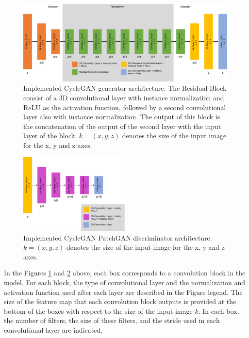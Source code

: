 \begin{figure}[!htb]
  \centering
  \includegraphics[width=0.99\textwidth]{Images/generator_cyclegan.jpg}
  \caption[Implemented CycleGAN generator architecture. The Residual Block consist of a 3D convolutional layer with instance normalization and ReLU as the activation function, followed by a second convolutional layer also with instance normalization. The output of this block is the concatenation of the output of the second layer with the input layer of the block. $k=(x,y,z)$ denotes the size of the input image for the x, y and z axes.]{Implemented CycleGAN generator architecture. The Residual Block consist of a \ac{3D} convolutional layer with instance normalization and \ac{ReLU} as the activation function, followed by a second convolutional layer also with instance normalization. The output of this block is the concatenation of the output of the second layer with the input layer of the block. $k=(x,y,z)$ denotes the size of the input image for the x, y and z axes.}
  \label{fig:gencyc}
\end{figure}

\begin{figure}[!htb]
  \centering
  \includegraphics[width=0.50\textwidth]{Images/discriminator_cyclegan.jpg}
  \caption{Implemented CycleGAN PatchGAN discriminator architecture. $k=(x,y,z)$ denotes the size of the input image for the x, y and z axes.}
  \label{fig:disccyc}
\end{figure}

In the Figures \ref{fig:gencyc} and \ref{fig:disccyc} above, each box corresponds to a convolution block in the model. For each block, the type of convolutional layer and the normalization and activation function used after each layer are described in the Figure legend. The size of the feature map that each convolution block outputs is provided at the bottom of the boxes with respect to the size of the input image $k$. In each box, the number of filters, the size of these filters, and the stride used in each convolutional layer are indicated.

